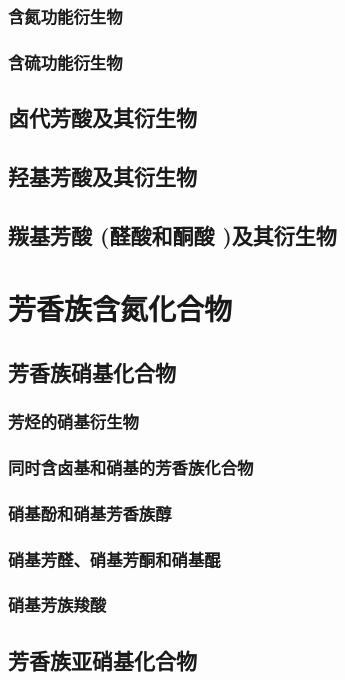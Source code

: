 \documentclass[UTF8]{../03-Chemistry}
\begin{document}
        \subsubsection{含氮功能衍生物}
        \subsubsection{含硫功能衍生物}
    \subsection{卤代芳酸及其衍生物}
    \subsection{羟基芳酸及其衍生物}
    \subsection{羰基芳酸 (醛酸和酮酸 )及其衍生物}
\section{芳香族含氮化合物}
    \subsection{芳香族硝基化合物}
        \subsubsection{芳烃的硝基衍生物}
        \subsubsection{同时含卤基和硝基的芳香族化合物}
        \subsubsection{硝基酚和硝基芳香族醇}
        \subsubsection{硝基芳醛、硝基芳酮和硝基醌}
        \subsubsection{硝基芳族羧酸}
    \subsection{芳香族亚硝基化合物}
\end{document}
